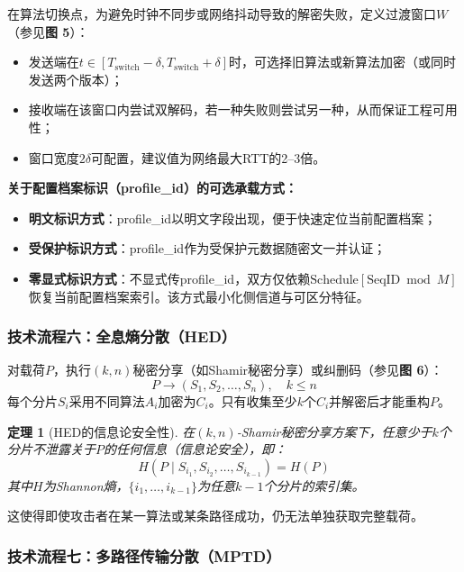﻿\documentclass[12pt,a4paper]{article}
\newtheorem{theorem}{定理}
\begin{document}
在算法切换点，为避免时钟不同步或网络抖动导致的解密失败，定义过渡窗口$W$（参见\textbf{图 5}）：

\begin{itemize}
    \item 发送端在$t \in [T_{\text{switch}}-\delta, T_{\text{switch}}+\delta]$时，可选择旧算法或新算法加密（或同时发送两个版本）；
    \item 接收端在该窗口内尝试双解码，若一种失败则尝试另一种，从而保证工程可用性；
    \item 窗口宽度$2\delta$可配置，建议值为网络最大RTT的2--3倍。
\end{itemize}

\textbf{关于配置档案标识（profile\_id）的可选承载方式：}
\begin{itemize}
    \item \textbf{明文标识方式}：profile\_id以明文字段出现，便于快速定位当前配置档案；
    \item \textbf{受保护标识方式}：profile\_id作为受保护元数据随密文一并认证；
    \item \textbf{零显式标识方式}：不显式传profile\_id，双方仅依赖$\text{Schedule}[\text{SeqID} \bmod M]$恢复当前配置档案索引。该方式最小化侧信道与可区分特征。
\end{itemize}

\subsubsection*{技术流程六：全息熵分散（HED）}

对载荷$P$，执行$(k,n)$秘密分享（如Shamir秘密分享）或纠删码（参见\textbf{图 6}）：
\[
P \to (S_1, S_2, \ldots, S_n), \quad k \leq n
\]
每个分片$S_i$采用不同算法$A_i$加密为$C_i$。只有收集至少$k$个$C_i$并解密后才能重构$P$。

\begin{theorem}[HED的信息论安全性]
在$(k,n)$-Shamir秘密分享方案下，任意少于$k$个分片不泄露关于$P$的任何信息（信息论安全），即：
\[
H(P \mid S_{i_1}, S_{i_2}, \ldots, S_{i_{k-1}}) = H(P)
\]
其中$H$为Shannon熵，$\{i_1, \ldots, i_{k-1}\}$为任意$k-1$个分片的索引集。
\end{theorem}

这使得即使攻击者在某一算法或某条路径成功，仍无法单独获取完整载荷。

\subsubsection*{技术流程七：多路径传输分散（MPTD）}
\end{document}
